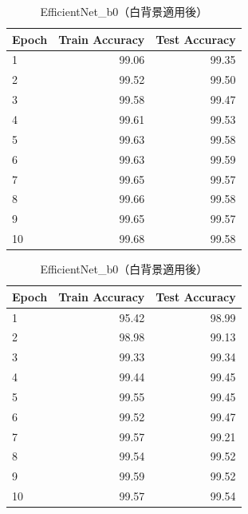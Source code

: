 \documentclass[a4paper,11pt,titlepage]{jsarticle}
\begin{document}
\begin{table}[H]
\begin{minipage}{0.49\hsize}
\centering
\caption{Custom Model（白背景適用後）}
\label{tab:Custom_white}
\begin{tabular}{lrr}
\hline
Epoch & Train Accuracy & Test Accuracy \\
\hline
1 & 99.06 & 99.35 \\
2 & 99.52 & 99.50 \\
3 & 99.58 & 99.47 \\
4 & 99.61 & 99.53 \\
5 & 99.63 & 99.58 \\
6 & 99.63 & 99.59 \\
7 & 99.65 & 99.57 \\
8 & 99.66 & 99.58 \\
9 & 99.65 & 99.57 \\
10 & 99.68 & 99.58 \\
\hline
\end{tabular}
\end{minipage}
\hfill
\begin{minipage}{0.49\hsize}
\centering
\caption{EfficientNet\_b0（白背景適用後）}
\label{tab:Efficientnetb0_white}
\begin{tabular}{lrr}
\hline
Epoch & Train Accuracy & Test Accuracy \\
\hline
1 & 95.42 & 98.99 \\
2 & 98.98 & 99.13 \\
3 & 99.33 & 99.34 \\
4 & 99.44 & 99.45 \\
5 & 99.55 & 99.45 \\
6 & 99.52 & 99.47 \\
7 & 99.57 & 99.21 \\
8 & 99.54 & 99.52 \\
9 & 99.59 & 99.52 \\
10 & 99.57 & 99.54 \\
\hline
\end{tabular}
\end{minipage}
\end{table}
\end{document}
